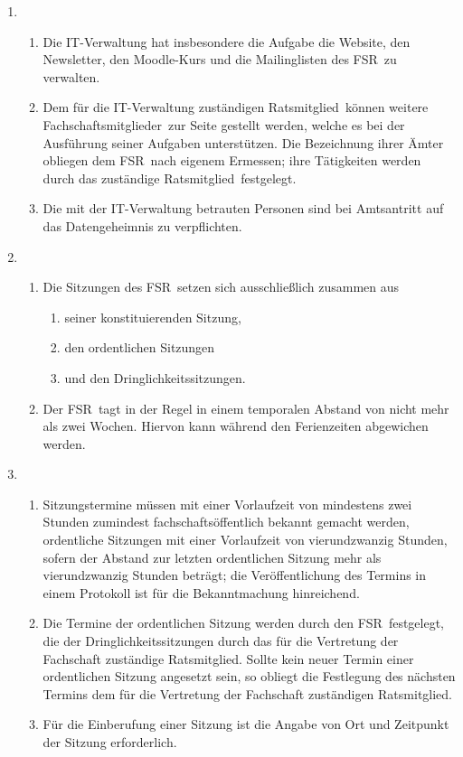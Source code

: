 \documentclass[a4paper, 12pt, ngerman]{article}
\newcommand{\rat}{FSR}
\newcommand{\rates}{FSR}
\newcommand{\mitglied}{Ratsmitglied}
\newcommand{\fsmitglieder}{Fachschaftsmitglieder}
\begin{document}
\begin{enumerate}[leftmargin=0cm]
	\item {}
	
	\begin{enumerate}[leftmargin=0cm]
		\item Die IT-Verwaltung hat insbesondere die Aufgabe die Website, den Newsletter, den Moodle-Kurs und die Mailinglisten des \rates~zu verwalten.
		\item Dem für die IT-Verwaltung zuständigen \mitglied~können weitere \fsmitglieder~zur Seite gestellt werden, welche es bei der Ausführung seiner Aufgaben unterstützen. Die Bezeichnung ihrer Ämter obliegen dem \rat~nach eigenem Ermessen; ihre Tätigkeiten werden durch das zuständige \mitglied~festgelegt.		
		\item Die mit der IT-Verwaltung betrauten Personen sind bei Amtsantritt auf das Datengeheimnis zu verpflichten.
	\end{enumerate}
 
	
	\item {}
	
	\begin{enumerate}[leftmargin=0cm]
		\item Die Sitzungen des \rates~setzen sich ausschließlich zusammen aus 
		\begin{enumerate}[leftmargin=0.5cm]
			\item seiner konstituierenden Sitzung,
			\item den ordentlichen Sitzungen
			\item und den Dringlichkeitssitzungen.
		\end{enumerate}
		\item Der \rat~tagt in der Regel in einem temporalen Abstand von nicht mehr als zwei Wochen. Hiervon kann während den Ferienzeiten abgewichen werden.
	\end{enumerate}
	
	\item {}
	
	\begin{enumerate}[leftmargin=0cm]
		\item Sitzungstermine müssen mit einer Vorlaufzeit von mindestens zwei Stunden zumindest fachschaftsöffentlich bekannt gemacht werden, ordentliche Sitzungen mit einer Vorlaufzeit von vierundzwanzig Stunden, sofern der Abstand zur letzten ordentlichen Sitzung mehr als vierundzwanzig Stunden beträgt; die Veröffentlichung des Termins in einem Protokoll ist für die Bekanntmachung hinreichend.
		\item Die Termine der ordentlichen Sitzung werden durch den \rat~festgelegt, die der Dringlichkeitssitzungen durch das für die Vertretung der Fachschaft zuständige \mitglied. Sollte kein neuer Termin einer ordentlichen Sitzung angesetzt sein, so obliegt die Festlegung des nächsten Termins dem für die Vertretung der Fachschaft zuständigen \mitglied.
		\item Für die Einberufung einer Sitzung ist die Angabe von Ort und Zeitpunkt der Sitzung erforderlich.
		

\end{enumerate}
\end{enumerate}
\end{document}
